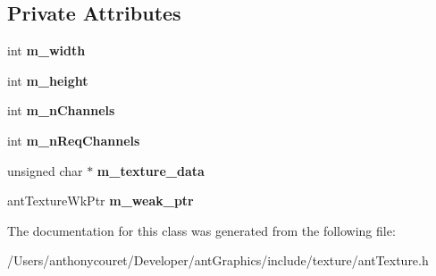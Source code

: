 \subsection*{Private Attributes}
\begin{DoxyCompactItemize}
\item 
\hypertarget{classant_texture_ade1b18b60443c11a750be1ff4c4e49b2}{int {\bfseries m\+\_\+width}}\label{classant_texture_ade1b18b60443c11a750be1ff4c4e49b2}

\item 
\hypertarget{classant_texture_a3a5886f800ff0cdf273a2eb3bdf93a15}{int {\bfseries m\+\_\+height}}\label{classant_texture_a3a5886f800ff0cdf273a2eb3bdf93a15}

\item 
\hypertarget{classant_texture_a6b48a2c81aa5739d0fe7494ac8924732}{int {\bfseries m\+\_\+n\+Channels}}\label{classant_texture_a6b48a2c81aa5739d0fe7494ac8924732}

\item 
\hypertarget{classant_texture_ac8aff5d0908959bf88a1c7860b7808df}{int {\bfseries m\+\_\+n\+Req\+Channels}}\label{classant_texture_ac8aff5d0908959bf88a1c7860b7808df}

\item 
\hypertarget{classant_texture_a797deb11ecf747457dbe5abcd54df7a0}{unsigned char $\ast$ {\bfseries m\+\_\+texture\+\_\+data}}\label{classant_texture_a797deb11ecf747457dbe5abcd54df7a0}

\item 
\hypertarget{classant_texture_a78aecdbf075ec87a470b905449b1cd9e}{ant\+Texture\+Wk\+Ptr {\bfseries m\+\_\+weak\+\_\+ptr}}\label{classant_texture_a78aecdbf075ec87a470b905449b1cd9e}

\end{DoxyCompactItemize}


The documentation for this class was generated from the following file\+:\begin{DoxyCompactItemize}
\item 
/\+Users/anthonycouret/\+Developer/ant\+Graphics/include/texture/ant\+Texture.\+h\end{DoxyCompactItemize}
